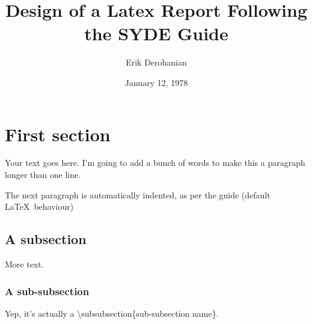 \documentclass[twoside, 12pt]{article}
\title{Design of a Latex Report Following the SYDE Guide}
\author{Erik Derohanian}
\date{January 12, 1978}
\begin{document}
	
	\makewtrtitle

	\tableofcontents
	\newpage

	\listoffigures
	\newpage
	\listoftables
	\newpage

	\startarabicpagenumbers

	\section{First section}

	Your text goes here. I'm going to add a bunch of words to make this a paragraph longer than one line.

	The next paragraph is automatically indented, as per the guide (default \LaTeX\ behaviour)

	\subsection{A subsection}

	More text.

	\subsubsection{A sub-subsection}

	Yep, it's actually a \textbackslash subsubsection\{sub-subsection name\}.
\end{document}
